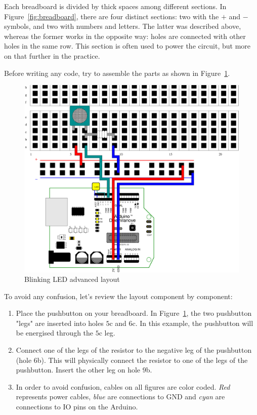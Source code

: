 Each breadboard is divided by thick spaces among different sections. In Figure~\ref{fig:breadboard}, there are four distinct sections: two with the $+$ and $-$ symbols, and two with numbers and letters. The latter was described above, whereas the former works in the opposite way: holes are connected with other holes in the same row. This section is often used to power the circuit, but more on that further in the practice.

Before writing any code, try to assemble the parts as shown in Figure~\ref{fig:blinkingLEDAdvancedLayout}.

\begin{figure}[htbp]
  \centering
  \includegraphics[width=0.7\linewidth]{figures/blinkingLEDAdvanced-scaled.eps}
  \caption{Blinking LED advanced layout
  \label{fig:blinkingLEDAdvancedLayout}}
\end{figure}

To avoid any confusion, let's review the layout component by component:

\begin{enumerate}
	\item Place the pushbutton on your breadboard. In Figure~\ref{fig:blinkingLEDAdvancedLayout}, the two pushbutton "legs" are inserted into holes $5$c and $6$c. In this example, the pushbutton will be energised through the $5$c leg.
	\item Connect one of the legs of the resistor to the negative leg of the pushbutton (hole $6$b). This will physically connect the resistor to one of the legs of the pushbutton. Insert the other leg on hole $9$b.
	\item In order to avoid confusion, cables on all figures are color coded. \emph{Red} represents power cables, \emph{blue} are connections to GND and \emph{cyan} are connections to IO pins on the Arduino.
\end{enumerate}